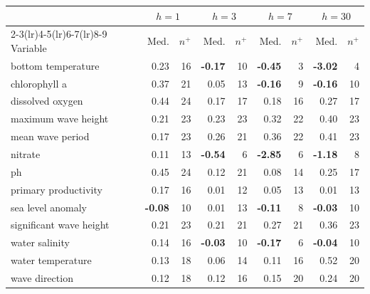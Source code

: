 \begin{tabular}{l rr rr rr rr}
\toprule
 & \multicolumn{2}{c}{$h=1$} & \multicolumn{2}{c}{$h=3$} & \multicolumn{2}{c}{$h=7$} & \multicolumn{2}{c}{$h=30$} \\
\cmidrule(lr){2-3}\cmidrule(lr){4-5}\cmidrule(lr){6-7}\cmidrule(lr){8-9}
Variable & Med. & $n^{+}$ & Med. & $n^{+}$ & Med. & $n^{+}$ & Med. & $n^{+}$ \\
\midrule
bottom temperature & 0.23 & 16 & \textbf{-0.17} & 10 & \textbf{-0.45} & 3 & \textbf{-3.02} & 4 \\
chlorophyll a & 0.37 & 21 & 0.05 & 13 & \textbf{-0.16} & 9 & \textbf{-0.16} & 10 \\
dissolved oxygen & 0.44 & 24 & 0.17 & 17 & 0.18 & 16 & 0.27 & 17 \\
maximum wave height & 0.21 & 23 & 0.23 & 23 & 0.32 & 22 & 0.40 & 23 \\
mean wave period & 0.17 & 23 & 0.26 & 21 & 0.36 & 22 & 0.41 & 23 \\
nitrate & 0.11 & 13 & \textbf{-0.54} & 6 & \textbf{-2.85} & 6 & \textbf{-1.18} & 8 \\
ph & 0.45 & 24 & 0.12 & 21 & 0.08 & 14 & 0.25 & 17 \\
primary productivity & 0.17 & 16 & 0.01 & 12 & 0.05 & 13 & 0.01 & 13 \\
sea level anomaly & \textbf{-0.08} & 10 & 0.01 & 13 & \textbf{-0.11} & 8 & \textbf{-0.03} & 10 \\
significant wave height & 0.21 & 23 & 0.21 & 21 & 0.27 & 21 & 0.36 & 23 \\
water salinity & 0.14 & 16 & \textbf{-0.03} & 10 & \textbf{-0.17} & 6 & \textbf{-0.04} & 10 \\
water temperature & 0.13 & 18 & 0.06 & 14 & 0.11 & 16 & 0.52 & 20 \\
wave direction & 0.12 & 18 & 0.12 & 16 & 0.15 & 20 & 0.24 & 20 \\
\bottomrule
\end{tabular}